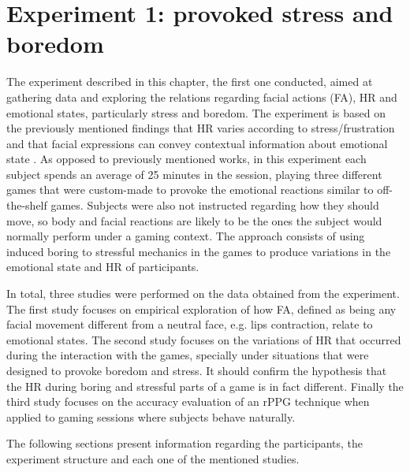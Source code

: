 \chapter{Experiment 1: provoked stress and boredom}
\label{ch:experiment1}

The experiment described in this chapter, the first one conducted, aimed at gathering data and exploring the relations regarding facial actions (FA), HR and emotional states, particularly stress and boredom. The experiment is based on the previously mentioned findings that HR varies according to stress/frustration and that facial expressions can convey contextual information about emotional state \parencite{giannakakis2017stress}. As opposed to previously mentioned works, in this experiment each subject spends an average of 25 minutes in the session, playing three different games that were custom-made to provoke the emotional reactions similar to off-the-shelf games. Subjects were also not instructed regarding how they should move, so body and facial reactions are likely to be the ones the subject would normally perform under a gaming context. The approach consists of using induced boring to stressful mechanics in the games to produce variations in the emotional state and HR of participants. %

In total, three studies were performed on the data obtained from the experiment. The first study focuses on empirical exploration of how FA, defined as being any facial movement different from a neutral face, e.g. lips contraction, relate to emotional states. The second study focuses on the variations of HR that occurred during the interaction with the games, specially under situations that were designed to provoke boredom and stress. It should confirm the hypothesis that the HR during boring and stressful parts of a game is in fact different. Finally the third study focuses on the accuracy evaluation of an rPPG technique when applied to gaming sessions where subjects behave naturally.

The following sections present information regarding the participants, the experiment structure and each one of the mentioned studies.


